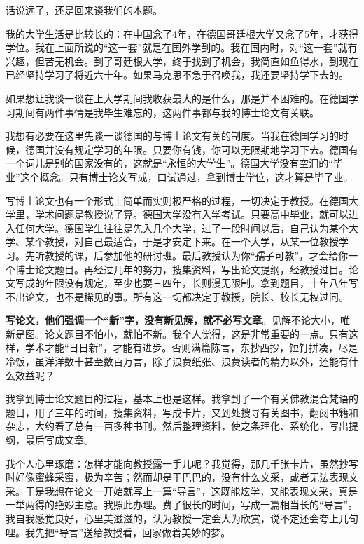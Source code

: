 \documentclass[UTF8,a4paper,8pt]{ctexart}
\begin{document}
 话说远了，还是回来谈我们的本题。
 
 我的大学生活是比较长的：在中国念了4年，在德国哥廷根大学又念了5年，才获得学位。我在上面所说的“这一套”就是在国外学到的。我在国内时，对“这一套”就有兴趣，但苦无机会。到了哥廷根大学，终于找到了机会，我简直如鱼得水，到现在已经坚持学习了将近六十年。如果马克思不急于召唤我，我还要坚持学下去的。
 
 如果想让我谈一谈在上大学期间我收获最大的是什么，那是并不困难的。在德国学习期间有两件事情是我毕生难忘的，这两件事都与我的博士论文有关联。
 
 我想有必要在这里先谈一谈德国的与博士论文有关的制度。当我在德国学习的时候，德国并没有规定学习的年限。只要你有钱，你可以无限期地学习下去。德国有一个词儿是别的国家没有的，这就是“永恒的大学生”。德国大学没有空洞的“毕业”这个概念。只有博士论文写成，口试通过，拿到博士学位，这才算是毕了业。
 
 写博士论文也有一个形式上简单而实则极严格的过程，一切决定于教授。在德国大学里，学术问题是教授说了算。德国大学没有入学考试。只要高中毕业，就可以进入任何大学。德国学生往往是先入几个大学，过了一段时间以后，自己认为某个大学、某个教授，对自己最适合，于是才安定下来。在一个大学，从某一位教授学习。先听教授的课，后参加他的研讨班。最后教授认为你“孺子可教”，才会给你一个博士论文题目。再经过几年的努力，搜集资料，写出论文提纲，经教授过目。论文写成的年限没有规定，至少也要三四年，长则漫无限制。拿到题目，十年八年写不出论文，也不是稀见的事。所有这一切都决定于教授，院长、校长无权过问。
 
 \textbf{写论文，他们强调一个“新”字，没有新见解，就不必写文章}。见解不论大小，唯新是图。论文题目不怕小，就怕不新。我个人觉得，这是非常重要的一点。只有这样，学术才能“日日新”，才能有进步。否则满篇陈言，东抄西抄，饾饤拼凑，尽是冷饭，虽洋洋数十甚至数百万言，除了浪费纸张、浪费读者的精力以外，还能有什么效益呢？
 
 我拿到博士论文题目的过程，基本上也是这样。我拿到了一个有关佛教混合梵语的题目，用了三年的时间，搜集资料，写成卡片，又到处搜寻有关图书，翻阅书籍和杂志，大约看了总有一百多种书刊。然后整理资料，使之条理化、系统化，写出提纲，最后写成文章。
 
 我个人心里琢磨：怎样才能向教授露一手儿呢？我觉得，那几千张卡片，虽然抄写时好像蜜蜂采蜜，极为辛苦；然而却是干巴巴的，没有什么文采，或者无法表现文采。于是我想在论文一开始就写上一篇“导言”，这既能炫学，又能表现文采，真是一举两得的绝妙主意。我照此办理。费了很长的时间，写成一篇相当长的“导言”。我自我感觉良好，心里美滋滋的，认为教授一定会大为欣赏，说不定还会夸上几句哩。我先把“导言”送给教授看，回家做着美妙的梦。
 
\end{document}
